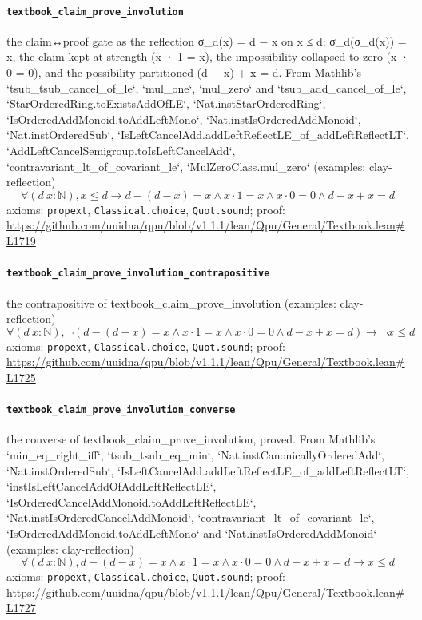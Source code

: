 \documentclass[11pt]{article}
\begin{document}
\paragraph{\texttt{textbook\_claim\_prove\_involution}}
the claim↔proof gate as the reflection σ\_d(x) = d − x on x ≤ d: σ\_d(σ\_d(x)) = x, the claim kept at strength (x · 1 = x), the impossibility collapsed to zero (x · 0 = 0), and the possibility partitioned (d − x) + x = d. From Mathlib's `tsub\_tsub\_cancel\_of\_le`, `mul\_one`, `mul\_zero` and `tsub\_add\_cancel\_of\_le`, `StarOrderedRing.toExistsAddOfLE`, `Nat.instStarOrderedRing`, `IsOrderedAddMonoid.toAddLeftMono`, `Nat.instIsOrderedAddMonoid`, `Nat.instOrderedSub`, `IsLeftCancelAdd.addLeftReflectLE\_of\_addLeftReflectLT`, `AddLeftCancelSemigroup.toIsLeftCancelAdd`, `contravariant\_lt\_of\_covariant\_le`, `MulZeroClass.mul\_zero` (examples: clay-reflection)
\[ \forall (d\ x : \mathbb{N}), x \le d \to d - (d - x) = x \land x \cdot 1 = x \land x \cdot 0 = 0 \land d - x + x = d \]
\noindent axioms: \texttt{propext}, \texttt{Classical.choice}, \texttt{Quot.sound}; proof: \url{https://github.com/uuidna/qpu/blob/v1.1.1/lean/Qpu/General/Textbook.lean\#L1719}

\paragraph{\texttt{textbook\_claim\_prove\_involution\_contrapositive}}
the contrapositive of textbook\_claim\_prove\_involution (examples: clay-reflection)
\[ \forall (d\ x : \mathbb{N}), \neg (d - (d - x) = x \land x \cdot 1 = x \land x \cdot 0 = 0 \land d - x + x = d) \to \neg x \le d \]
\noindent axioms: \texttt{propext}, \texttt{Classical.choice}, \texttt{Quot.sound}; proof: \url{https://github.com/uuidna/qpu/blob/v1.1.1/lean/Qpu/General/Textbook.lean\#L1725}

\paragraph{\texttt{textbook\_claim\_prove\_involution\_converse}}
the converse of textbook\_claim\_prove\_involution, proved. From Mathlib's `min\_eq\_right\_iff`, `tsub\_tsub\_eq\_min`, `Nat.instCanonicallyOrderedAdd`, `Nat.instOrderedSub`, `IsLeftCancelAdd.addLeftReflectLE\_of\_addLeftReflectLT`, `instIsLeftCancelAddOfAddLeftReflectLE`, `IsOrderedCancelAddMonoid.toAddLeftReflectLE`, `Nat.instIsOrderedCancelAddMonoid`, `contravariant\_lt\_of\_covariant\_le`, `IsOrderedAddMonoid.toAddLeftMono` and `Nat.instIsOrderedAddMonoid` (examples: clay-reflection)
\[ \forall (d\ x : \mathbb{N}), d - (d - x) = x \land x \cdot 1 = x \land x \cdot 0 = 0 \land d - x + x = d \to x \le d \]
\noindent axioms: \texttt{propext}, \texttt{Classical.choice}, \texttt{Quot.sound}; proof: \url{https://github.com/uuidna/qpu/blob/v1.1.1/lean/Qpu/General/Textbook.lean\#L1727}
\end{document}
